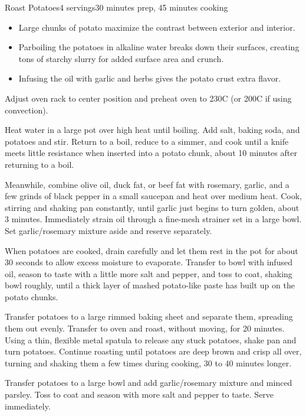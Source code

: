 \documentclass[../Cookbook.tex]{subfiles}
\begin{document}
\begin{recipe}{Roast Potatoes}{4 servings}{30 minutes prep, 45 minutes cooking}

\begin{itemize}
	\item Large chunks of potato maximize the contrast between exterior and interior.
	\item Parboiling the potatoes in alkaline water breaks down their surfaces, creating tons of starchy slurry for added surface area and crunch.
	\item Infusing the oil with garlic and herbs gives the potato crust extra flavor.
\end{itemize}

Adjust oven rack to center position and preheat oven to 230\0C (or 200\0C if using convection).

Heat water in a large pot over high heat until boiling. Add salt, baking soda, and potatoes and stir. Return to a boil, reduce to a simmer, and cook until a knife meets little resistance when inserted into a potato chunk, about 10 minutes after returning to a boil.

Meanwhile, combine olive oil, duck fat, or beef fat with rosemary, garlic, and a few grinds of black pepper in a small saucepan and heat over medium heat. Cook, stirring and shaking pan constantly, until garlic just begins to turn golden, about 3 minutes. Immediately strain oil through a fine-mesh strainer set in a large bowl. Set garlic/rosemary mixture aside and reserve separately.

\newstep
When potatoes are cooked, drain carefully and let them rest in the pot for about 30 seconds to allow excess moisture to evaporate. Transfer to bowl with infused oil, season to taste with a little more salt and pepper, and toss to coat, shaking bowl roughly, until a thick layer of mashed potato-like paste has built up on the potato chunks.

\newstep
Transfer potatoes to a large rimmed baking sheet and separate them, spreading them out evenly. Transfer to oven and roast, without moving, for 20 minutes. Using a thin, flexible metal spatula to release any stuck potatoes, shake pan and turn potatoes. Continue roasting until potatoes are deep brown and crisp all over, turning and shaking them a few times during cooking, 30 to 40 minutes longer.

\newstep
Transfer potatoes to a large bowl and add garlic/rosemary mixture and minced parsley. Toss to coat and season with more salt and pepper to taste. Serve immediately.

\end{recipe}
\end{document}
